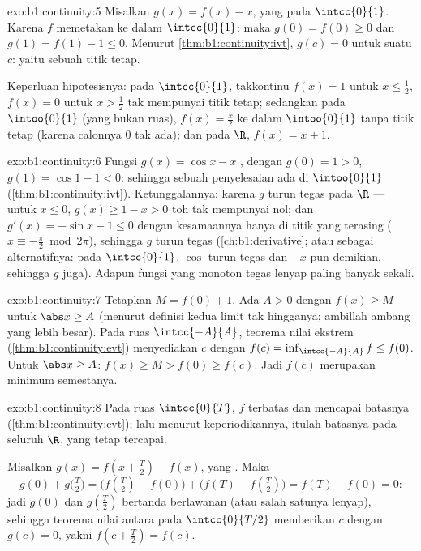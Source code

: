 \begin{solution}{exo:b1:continuity:5}
Misalkan $g(x) = f(x) - x$, yang  pada $\intcc{0}{1}$. Karena $f$ memetakan
ke dalam $\intcc{0}{1}$: maka $g(0) = f(0) \geq 0$ dan $g(1) = f(1) - 1 \leq
0$. Menurut \cref{thm:b1:continuity:ivt}, $g(c) = 0$ untuk suatu $c$: yaitu
sebuah titik tetap.

Keperluan hipotesisnya: pada $\intcc{0}{1}$,  takkontinu
$f(x) = 1$ untuk $x \leq \frac12$, $f(x) = 0$ untuk $x > \frac12$ tak mempunyai
titik tetap; sedangkan pada  $\intoo{0}{1}$ (yang bukan ruas), $f(x) =
\frac x2$  ke dalam $\intoo{0}{1}$ tanpa titik tetap
(karena calonnya $0$ tak ada); dan pada $\R$, $f(x) = x + 1$.
\end{solution}

\begin{solution}{exo:b1:continuity:6}
Fungsi $g(x) = \cos x - x$ , dengan $g(0) = 1 > 0$, $g(1) = \cos 1 -
1 < 0$: sehingga sebuah penyelesaian ada di $\intoo{0}{1}$
(\cref{thm:b1:continuity:ivt}). Ketunggalannya: karena $g$ turun
tegas pada $\R$ --- untuk $x \leq 0$, $g(x) \geq 1 - x > 0$ toh tak mempunyai
nol; dan $g'(x) = -\sin x - 1 \leq 0$ dengan kesamaannya hanya di
titik yang terasing ($x \equiv -\frac\pi2 \bmod 2\pi$), sehingga $g$ turun
tegas (\cref{ch:b1:derivative}; atau sebagai alternatifnya: pada
$\intcc{0}{1}$, $\cos$ turun tegas dan $-x$ pun demikian, sehingga $g$
juga). Adapun fungsi yang monoton tegas lenyap paling banyak sekali.
\end{solution}

\begin{solution}{exo:b1:continuity:7}
Tetapkan $M = f(0) + 1$. Ada $A > 0$ dengan $f(x) \geq M$ untuk $\abs x
\geq A$ (menurut definisi kedua limit tak hingganya; ambillah ambang yang
lebih besar). Pada ruas $\intcc{-A}{A}$, teorema nilai ekstrem
(\cref{thm:b1:continuity:evt}) menyediakan $c$ dengan $f(c) =
\inf_{\intcc{-A}{A}} f \leq f(0)$. Untuk $\abs x \geq A$: $f(x) \geq M
> f(0) \geq f(c)$. Jadi $f(c)$ merupakan minimum semestanya.
\end{solution}

\begin{solution}{exo:b1:continuity:8}
Pada ruas $\intcc{0}{T}$, $f$ terbatas dan mencapai batasnya
(\cref{thm:b1:continuity:evt}); lalu menurut keperiodikannya, itulah batasnya
pada seluruh $\R$, yang tetap tercapai.

Misalkan $g(x) = f(x + \frac T2) - f(x)$, yang . Maka
\[
g(0) + g\bigl(\tfrac T2\bigr)
= \bigl(f(\tfrac T2) - f(0)\bigr) + \bigl(f(T) - f(\tfrac T2)\bigr)
= f(T) - f(0) = 0 :
\]
jadi $g(0)$ dan $g(\frac T2)$ bertanda berlawanan (atau salah satunya lenyap), sehingga
teorema nilai antara pada $\intcc{0}{T/2}$ memberikan $c$ dengan
$g(c) = 0$, yakni $f(c + \frac T2) = f(c)$.
\end{solution}

